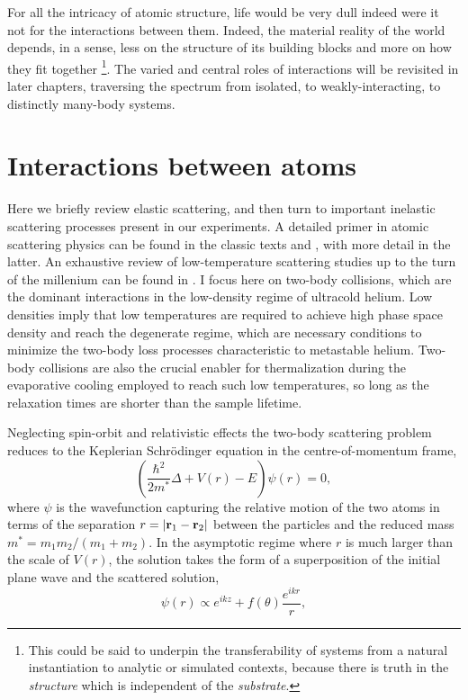 	
	For all the intricacy of atomic structure, life would be very dull indeed were it not for the interactions between them. Indeed, the material reality of the world depends, in a sense, less on the structure of its building blocks and more on how they fit together \footnote{This could be said to underpin the transferability of systems from a natural instantiation to analytic or simulated contexts, because there is truth in the \emph{structure} which is independent of the \emph{substrate}.}. The varied and central roles of interactions will be revisited in later chapters, traversing the spectrum from isolated, to weakly-interacting, to distinctly many-body systems. 


\section{Interactions between atoms}

	
	Here we briefly review elastic scattering, and then turn to important inelastic scattering processes present in our experiments. A detailed primer in atomic scattering physics can be found in the classic texts \cite{PitaevskiiStringari} and \cite{PethickSmith}, with more detail in the latter. An exhaustive review of low-temperature scattering studies up to the turn of the millenium can be found in \cite{weiner99}. I focus here on two-body collisions, which are the dominant interactions in the low-density regime of ultracold helium. Low densities imply that low temperatures are required to achieve high phase space density and reach the degenerate regime, which are necessary conditions to minimize the two-body loss processes characteristic to metastable helium. Two-body collisions are also the crucial enabler for thermalization during the evaporative cooling employed to reach such low temperatures, so long as the relaxation times are shorter than the sample lifetime.

	Neglecting spin-orbit and relativistic effects the two-body scattering problem reduces to the Keplerian Schr\"{o}dinger equation in the centre-of-momentum frame,
	\begin{equation}
	\left(\frac{\hbar^2}{2m^*}\Delta + V(r) - E\right)\psi(r) = 0,
	\end{equation}
	where $\psi$ is the wavefunction capturing the relative motion of the two atoms	in terms of the separation $r=|\textbf{r}_1-\textbf{r}_2|$ between the particles and the reduced mass $m^*=m_1m_2/(m_1+m_2)$. In the asymptotic regime where $r$ is much larger than the scale of $V(r)$, the solution takes the form of a superposition of the initial plane wave and the scattered solution,
	\begin{equation}
	\psi(r) \propto e^{ikz} + f(\theta)\frac{e^{ikr}}{r},
	\end{equation}

